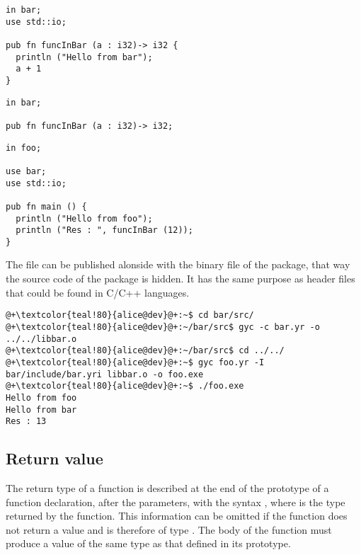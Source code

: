 \begin{lstlisting}[caption=\textit{./bar/src/bar.yr}, style=coloredverbatim]
in bar;
use std::io;

pub fn funcInBar (a : i32)-> i32 {
  println ("Hello from bar");
  a + 1
}
\end{lstlisting}

\begin{lstlisting}[caption=\textit{./bar/include/bar.yri}, style=coloredverbatim]
in bar;

pub fn funcInBar (a : i32)-> i32;
\end{lstlisting}
\begin{lstlisting}[caption=\textit{foo.yr}, style=coloredverbatim]
in foo;

use bar;
use std::io;

pub fn main () {
  println ("Hello from foo");
  println ("Res : ", funcInBar (12));
}
\end{lstlisting}


The file  can be published alonside with the
binary file of the  package, that way the source code of the package
 is hidden. It has the same purpose as header files that could be
found in C/C++ languages.

\begin{lstlisting}[style=bashVerb, escapechar=@+]
@+\textcolor{teal!80}{alice@dev}@+:~$ cd bar/src/
@+\textcolor{teal!80}{alice@dev}@+:~/bar/src$ gyc -c bar.yr -o ../../libbar.o
@+\textcolor{teal!80}{alice@dev}@+:~/bar/src$ cd ../../
@+\textcolor{teal!80}{alice@dev}@+:~$ gyc foo.yr -I bar/include/bar.yri libbar.o -o foo.exe
@+\textcolor{teal!80}{alice@dev}@+:~$ ./foo.exe
Hello from foo
Hello from bar
Res : 13
\end{lstlisting}

\subsection {Return value}

The return type of a function is described at the end of the prototype of a
function declaration, after the parameters, with the syntax , where
 is the type returned by the function. This information can be omitted
if the function does not return a value and is therefore of type .
The body of the function must produce a value of the same type as that defined
in its prototype.

